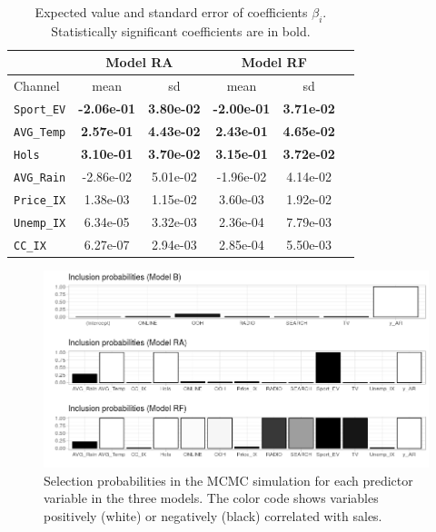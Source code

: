 \begin{table}[H]
\centering
\begin{tabular}{ |l|c|c|c|c|c| }
  \hline
  &  \multicolumn{2}{|c|}{Model RA} & \multicolumn{2}{|c|}{Model RF}\\
  \hline
  Channel & mean & sd & mean & sd\\
  \hline
  \texttt{Sport\_EV} & \textbf{-2.06e-01} & \textbf{3.80e-02} & \textbf{-2.00e-01} &\textbf{ 3.71e-02} \\
  \texttt{AVG\_Temp} &  \textbf{2.57e-01} & \textbf{4.43e-02} & \textbf{2.43e-01} & \textbf{4.65e-02}   \\
  \texttt{Hols} & \textbf{3.10e-01} &\textbf{ 3.70e-02}   & \textbf{3.15e-01} & \textbf{3.72e-02}  \\
  \texttt{AVG\_Rain} &  -2.86e-02 & 5.01e-02 & -1.96e-02 & 4.14e-02     \\
  \texttt{Price\_IX} &  1.38e-03 &  1.15e-02 & 3.60e-03 & 1.92e-02  \\
  \texttt{Unemp\_IX} &  6.34e-05 & 3.32e-03 & 2.36e-04 & 7.79e-03  \\
  \texttt{CC\_IX} & 6.27e-07 & 2.94e-03 & 2.85e-04 & 5.50e-03 \\
    \hline
\end{tabular} \caption{Expected value and standard error of coefficients $\beta_i$. Statistically significant coefficients are in bold.}\label{tab:11}
\end{table}



\begin{figure}[H]
\centering
\includegraphics[scale=0.6]{figures/inc_probas2.png}
\caption{Selection probabilities in the MCMC simulation for each predictor variable in the three models. The color code shows variables positively (white) or negatively (black) correlated with sales. }\label{fig:inc_probas}
\end{figure}

